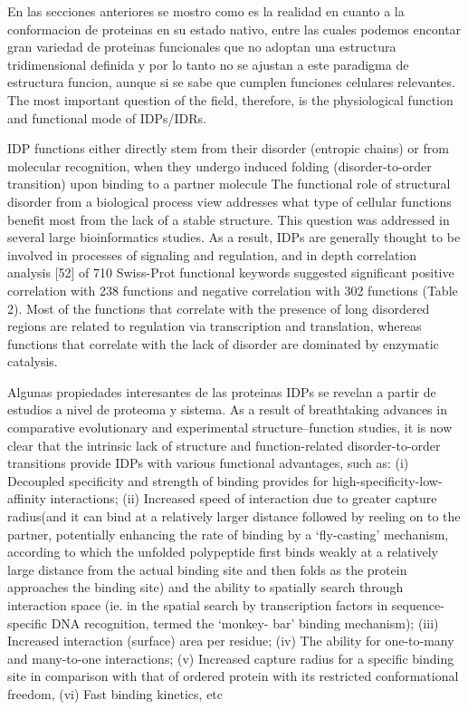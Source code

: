 
En las secciones anteriores se mostro como es la realidad en cuanto a la conformacion de proteinas en su estado nativo, entre las cuales podemos encontar gran variedad de proteinas funcionales que no adoptan una estructura tridimensional definida
y por lo tanto no se ajustan a este paradigma de estructura funcion, aunque si se sabe que cumplen funciones celulares relevantes.
The most important question of the field, therefore, is the physiological function and functional mode of IDPs/IDRs.


IDP functions either directly stem from their disorder (entropic chains) or from molecular recognition, when they undergo induced folding (disorder-to-order transition) upon binding to a partner molecule
The functional role of structural disorder from a biological process view addresses what type of cellular functions benefit most from the lack of a stable structure. This question was addressed in several large bioinformatics studies. 
As a result, IDPs are generally thought to be involved in processes of signaling and regulation, and in depth correlation analysis [52] of 710 Swiss-Prot functional keywords suggested significant positive correlation with 238 functions and negative correlation with 302 functions (Table 2). 
Most of the functions that correlate with the presence of long disordered regions are related to regulation via transcription and translation, whereas functions that correlate with the lack of disorder are dominated by enzymatic catalysis.

Algunas propiedades interesantes de las proteinas IDPs se revelan a partir de estudios a nivel de proteoma y sistema.
As a result of breathtaking advances in comparative evolutionary and experimental structure–function studies, it is now clear that the intrinsic lack of structure and function-related disorder-to-order transitions provide
IDPs with various functional advantages\cite{gunasekaran2003extended,dyson2005intrinsically}, such as: (i) Decoupled specificity and strength of
binding provides for high-specificity-low-affinity interactions; 
(ii) Increased speed of
interaction due to greater capture radius(and it can bind at a relatively larger distance
followed by reeling on to the partner, potentially enhancing
the rate of binding by a ‘fly-casting’ mechanism, according to which the unfolded polypeptide first binds weakly at a relatively large
distance from the actual binding site and then folds as the protein approaches the binding
site)
and the ability to spatially search through
interaction space (ie. in the spatial search by transcription factors
in sequence-specific DNA recognition, termed the ‘monkey-
bar’ binding mechanism);
(iii) Increased interaction (surface) area per residue; (iv) The ability for
one-to-many and many-to-one interactions; (v) Increased capture radius for a specific
binding site in comparison with that of ordered protein with its restricted conformational
freedom, (vi) Fast binding kinetics, etc

